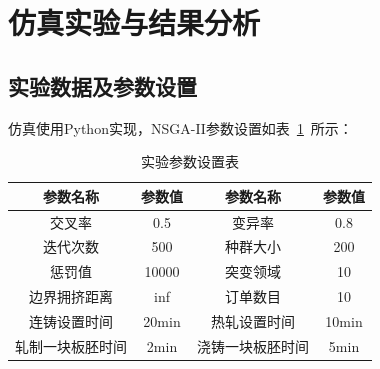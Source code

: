 \documentclass{whutmod}
\begin{document}
\section{仿真实验与结果分析}
\subsection{实验数据及参数设置}
仿真使用Python实现，NSGA-II参数设置如表~\ref{biaozi}~所示：
\begin{table}[H]
\centering		
\caption{实验参数设置表}\label{biaozi}
\begin{tabular}{cccc}
\toprule[2pt]
\multicolumn{1}{m{3cm}}{\centering 参数名称}
& \multicolumn{1}{m{3cm}}{\centering 参数值}
&  \multicolumn{1}{m{3cm}}{\centering 参数名称}
& \multicolumn{1}{m{3cm}}{\centering 参数值}
\\
\midrule[1pt]
交叉率 & 0.5 & 变异率& 0.8\\ 
迭代次数 &500 &种群大小 & 200\\ 
惩罚值 &10000 &突变领域 & 10\\ 
边界拥挤距离 &inf &订单数目 & 10\\ 
连铸设置时间 &20min &热轧设置时间 & 10min\\ 
轧制一块板胚时间 &2min &浇铸一块板胚时间 & 5min\\ 
\bottomrule[2pt]	
\end{tabular}
\end{table}
\end{document}
